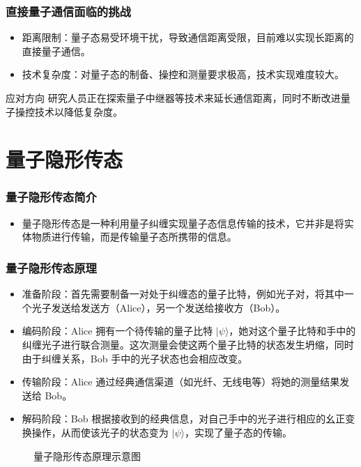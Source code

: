 \begin{frame}
    \frametitle{直接量子通信面临的挑战}
    \begin{itemize}
        \item 距离限制：量子态易受环境干扰，导致通信距离受限，目前难以实现长距离的直接量子通信。
        \item 技术复杂度：对量子态的制备、操控和测量要求极高，技术实现难度较大。
    \end{itemize}
    \begin{alertblock}{应对方向}
        研究人员正在探索量子中继器等技术来延长通信距离，同时不断改进量子操控技术以降低复杂度。
    \end{alertblock}
\end{frame}

\section{量子隐形传态}
\begin{frame}
    \frametitle{量子隐形传态简介}
    \begin{itemize}
        \item 量子隐形传态是一种利用量子纠缠实现量子态信息传输的技术，它并非是将实体物质进行传输，而是传输量子态所携带的信息。
    \end{itemize}
\end{frame}

\begin{frame}
    \frametitle{量子隐形传态原理}
    \begin{itemize}
        \item 准备阶段：首先需要制备一对处于纠缠态的量子比特，例如光子对，将其中一个光子发送给发送方（Alice），另一个发送给接收方（Bob）。
        \item 编码阶段：Alice 拥有一个待传输的量子比特 \( |\psi\rangle \)，她对这个量子比特和手中的纠缠光子进行联合测量。这次测量会使这两个量子比特的状态发生坍缩，同时由于纠缠关系，Bob 手中的光子状态也会相应改变。
        \item 传输阶段：Alice 通过经典通信渠道（如光纤、无线电等）将她的测量结果发送给 Bob。
        \item 解码阶段：Bob 根据接收到的经典信息，对自己手中的光子进行相应的幺正变换操作，从而使该光子的状态变为 \( |\psi\rangle \)，实现了量子态的传输。
    \end{itemize}
    \begin{figure}
        \centering
        \caption{量子隐形传态原理示意图}
    \end{figure}
\end{frame}

